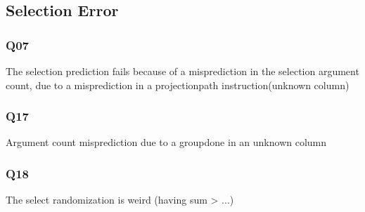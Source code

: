 \subsection{Selection Error }

\subsubsection{Q07}
The selection prediction fails because of a misprediction in the selection
argument count, due to a misprediction in a projectionpath instruction(unknown column)
\subsubsection{Q17}
Argument count misprediction due to a groupdone in an unknown column
\subsubsection{Q18}
The select randomization is weird (having sum > ...)

